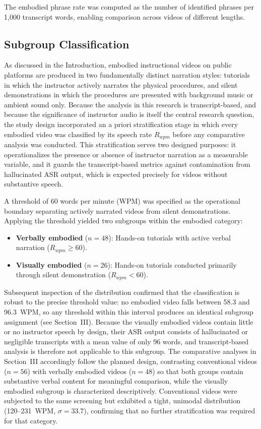\noindent The embodied phrase rate was computed as the number of identified phrases per 1{,}000 transcript words, enabling comparison across videos of different lengths.

\subsection{Subgroup Classification}
\label{sec:subgroup}

As discussed in the Introduction, embodied instructional videos on public platforms are produced in two fundamentally distinct narration styles: tutorials in which the instructor actively narrates the physical procedures, and silent demonstrations in which the procedures are presented with background music or ambient sound only. Because the analysis in this research is transcript-based, and because the significance of instructor audio is itself the central research question, the study design incorporated an a priori stratification stage in which every embodied video was classified by its speech rate $R_{wpm}$ before any comparative analysis was conducted. This stratification serves two designed purposes: it operationalizes the presence or absence of instructor narration as a measurable variable, and it guards the transcript-based metrics against contamination from hallucinated ASR output, which is expected precisely for videos without substantive speech.

A threshold of 60 words per minute (WPM) was specified as the operational boundary separating actively narrated videos from silent demonstrations. Applying the threshold yielded two subgroups within the embodied category:
\begin{itemize}
    \item \textbf{Verbally embodied} ($n = 48$): Hands-on tutorials with active verbal narration ($R_{wpm} \geq 60$).
    \item \textbf{Visually embodied} ($n = 26$): Hands-on tutorials conducted primarily through silent demonstration ($R_{wpm} < 60$).
\end{itemize}

\noindent Subsequent inspection of the distribution confirmed that the classification is robust to the precise threshold value: no embodied video falls between 58.3 and 96.3~WPM, so any threshold within this interval produces an identical subgroup assignment (see Section~III). Because the visually embodied videos contain little or no instructor speech by design, their ASR output consists of hallucinated or negligible transcripts with a mean value of only 96 words, and transcript-based analysis is therefore not applicable to this subgroup. The comparative analyses in Section~III accordingly follow the planned design, contrasting conventional videos ($n = 56$) with verbally embodied videos ($n = 48$) so that both groups contain substantive verbal content for meaningful comparison, while the visually embodied subgroup is characterized descriptively. Conventional videos were subjected to the same screening but exhibited a tight, unimodal distribution (120--231~WPM, $\sigma = 33.7$), confirming that no further stratification was required for that category.


